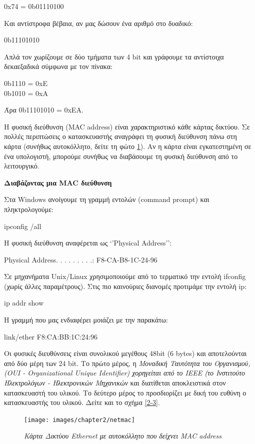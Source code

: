 \begin{inthebox}
0x74 = 0b01110100

Και αντίστροφα βέβαια, αν μας δώσουν ένα αριθμό στο δυαδικό:

0b11101010

Απλά τον χωρίζουμε σε δύο τμήματα των 4 bit και γράφουμε τα αντίστοιχα δεκαεξαδικά σύμφωνα με τον πίνακα:

0b1110 = 0xΕ \\
0b1010 = 0xΑ

Άρα 0b11101010 = 0xEA.\\
\end{inthebox}

Η φυσική διεύθυνση (MAC address) είναι χαρακτηριστικό κάθε κάρτας δικτύου. Σε πολλές περιπτώσεις ο κατασκευαστής αναγράφει τη φυσική διεύθυνση πάνω στη κάρτα (συνήθως αυτοκόλλητο, δείτε τη φώτο \ref{2-7}). Αν η κάρτα είναι εγκατεστημένη σε ένα υπολογιστή, μπορούμε συνήθως να διαβάσουμε τη φυσική διεύθυνση από το λειτουργικό.

\begin{inthebox}
\textbf{Διαβάζοντας μια MAC διεύθυνση}

Στα Windows ανοίγουμε τη γραμμή εντολών (command prompt) και πληκτρολογούμε:

ipconfig /all

Η φυσική διεύθυνση αναφέρεται ως `'Physical Address'':

Physical Address. . . . . . . . .: F8-CA-B8-1C-24-96

Σε μηχανήματα Unix/Linux χρησιμοποιούμε από το τερματικό την εντολή ifconfig (χωρίς άλλες παραμέτρους). Στις πιο καινούριες διανομές προτιμάμε την εντολή ip:

ip addr show

Η γραμμή που μας ενδιαφέρει μοιάζει με την παρακάτω:

link/ether F8:CA:BB:1C:24:96\\
\end{inthebox}

Οι φυσικές διευθύνσεις είναι συνολικού μεγέθους 48bit (6 bytes) και αποτελούνται από δύο μέρη των 24 bit. Το πρώτο μέρος, η \emph{Μοναδική Ταυτότητα του Οργανισμού, (OUI - Organizational Unique Identifier) χορηγείται από το IEEE (το Ινστιτούτο Ηλεκτρολόγων - Ηλεκτρονικών Μηχανικών} και διατίθεται αποκλειστικά στον κατασκευαστή του υλικού. Το δεύτερο μέρος το προσδιορίζει με δική του ευθύνη ο κατασκευαστής του υλικού. Δείτε και το σχήμα \ref{2-3}.

\begin{figure}[!ht]
  \centering
  \texttt{[image: images/chapter2/netmac]}
  \caption {\textsl{Κάρτα Δικτύου Ethernet με αυτοκόλλητο που δείχνει MAC address}}
  \label{2-7}
\end{figure}

